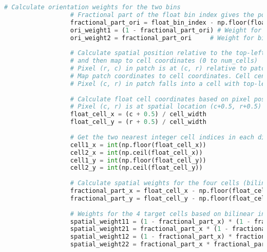 \begin{lstlisting}[caption={student.py}, label={lst:code-example}, captionpos=t, language=python]
                  # Calculate orientation weights for the two bins
                  # Fractional part of the float bin index gives the position between the two bins
                  fractional_part_ori = float_bin_index - np.floor(float_bin_index)
                  ori_weight1 = (1 - fractional_part_ori) # Weight for bin1_index
                  ori_weight2 = fractional_part_ori     # Weight for bin2_index
  
                  # Calculate spatial position relative to the top-left of the feature window (0 to feature_width-1)
                  # and then map to cell coordinates (0 to num_cells)
                  # Pixel (r, c) in patch is at (c, r) relative to patch top-left
                  # Map patch coordinates to cell coordinates. Cell centers are at (0.5, 1.5, 2.5, 3.5) * cell_width + cell_width/2
                  # Pixel (c, r) in patch falls into a cell with top-left at floor(c/cell_width)*cell_width, floor(r/cell_width)*cell_width
  
                  # Calculate float cell coordinates based on pixel position within the feature window (0 to num_cells)
                  # Pixel (c, r) is at spatial location (c+0.5, r+0.5) within the patch (0 to feature_width)
                  float_cell_x = (c + 0.5) / cell_width
                  float_cell_y = (r + 0.5) / cell_width
  
                  # Get the two nearest integer cell indices in each dimension (0 to num_cells)
                  cell1_x = int(np.floor(float_cell_x))
                  cell2_x = int(np.ceil(float_cell_x))
                  cell1_y = int(np.floor(float_cell_y))
                  cell2_y = int(np.ceil(float_cell_y))
  
                  # Calculate spatial weights for the four cells (bilinear interpolation)
                  fractional_part_x = float_cell_x - np.floor(float_cell_x)
                  fractional_part_y = float_cell_y - np.floor(float_cell_y)
  
                  # Weights for the 4 target cells based on bilinear interpolation
                  spatial_weight11 = (1 - fractional_part_x) * (1 - fractional_part_y) # cell1_x, cell1_y
                  spatial_weight21 = fractional_part_x * (1 - fractional_part_y)     # cell2_x, cell1_y
                  spatial_weight12 = (1 - fractional_part_x) * fractional_part_y     # cell1_x, cell2_y
                  spatial_weight22 = fractional_part_x * fractional_part_y         # cell2_x, cell2_y
  

\end{lstlisting}
